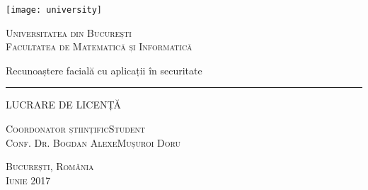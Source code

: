\begin{titlepage}
	\begin{center}

		\texttt{[image: university]}

		\vspace{0.5cm}
		\LARGE \textsc{Universitatea din București}
		\\
		\vspace{0.5cm}
		\Large \textsc{Facultatea de Matematică și Informatică}

		\vfill

		\Huge Recunoaștere facială cu aplicații în securitate
		\rule{\textwidth}{1pt}
		\Large LUCRARE DE LICENȚĂ

		\vfill

		\Large
		\textsc{Coordonator științific}\hfill \textsc{Student}
		\\
		\large
		\textsc{Conf. Dr. Bogdan Alexe}\hfill \textsc{Mușuroi Doru}
	
		\vspace{1.5cm}
		\textsc{București, România}\\
		\textsc{Iunie 2017}

	\end{center}
\end{titlepage}
 
